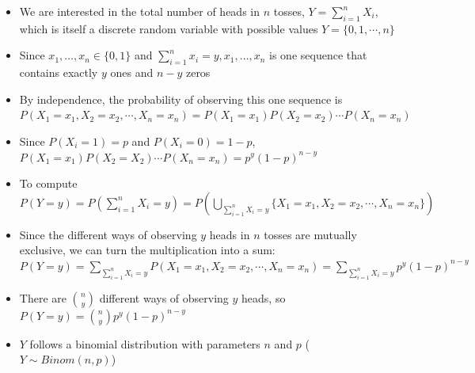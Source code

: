 \documentclass{article}
\begin{document}
\begin{itemize}
\begin{itemize}
        \item We are interested in the total number of heads in $n$ tosses, $Y = \sum_{i=1}^n X_i$, which is itself a discrete random variable with possible values $Y = \{0,1, \cdots, n\}$
        \item Since $x_1, \dots, x_n \in \{0,1\}$ and $\sum_{i=1}^n x_i = y, x_1, \dots, x_n$ is one sequence that contains exactly $y$ ones and $n-y$ zeros
        \item By independence, the probability of observing this one sequence is $P(X_1=x_1, X_2=x_2, \cdots, X_n = x_n) = P(X_1=x_1)P(X_2=x_2) \cdots P(X_n = x_n)$
        \item Since $P(X_i = 1) = p$ and $P(X_i = 0) = 1 - p$, $P(X_1=x_1)P(X_2=X_2)\cdots P(X_n=x_n) = p^y (1-p)^{n-y}$
        \item To compute $P(Y=y)=P(\sum_{i=1}^n X_i = y) = P\left( \bigcup_{\sum_{i=1}^n X_i=y} \{X_1=x_1, X_2=x_2, \cdots, X_n=x_n\} \right)$
        \item Since the different ways of observing $y$ heads in $n$ tosses are mutually exclusive, we can turn the multiplication into a sum:
        $P(Y=y)=\sum_{\sum_{i=1}^n X_i =y} P(X_1=x_1, X_2=x_2, \cdots, X_n=x_n) = \sum_{\sum_{i=1}^n X_i = y} p^y (1-p)^{n-y}$
        \item There are $\binom{n}{y}$ different ways of observing $y$ heads, so $P(Y=y)=\binom{n}{y} p^y (1-p)^{n-y}$
        \item $Y$ follows a binomial distribution with parameters $n$ and $p$ ($Y \sim Binom(n,p)$)
    \end{itemize}
\end{itemize}
\end{document}
